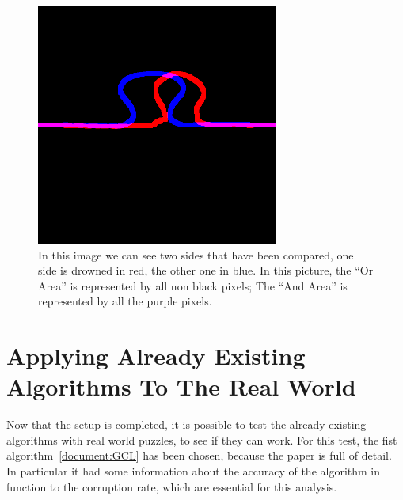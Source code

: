 \documentclass{article}
\begin{document}
\begin{figure}[htbp]
  \centering
  \begin{minipage}[t]{0.44\textwidth}
    \vspace{3pt} %
    \includegraphics[width=\textwidth]{pictures/side_comparation.png}
  \end{minipage}
  \hfill
  \begin{minipage}[t]{0.54\textwidth}
    \caption{\newline
    In this image we can see two sides that have been
    compared, one side is drowned in red, the other one in blue.
    In this picture, the “Or Area” is represented by all non
    black pixels; The “And Area” is represented by all the
    purple pixels.}
  \end{minipage}
\end{figure}
\clearpage

\section{Applying Already Existing Algorithms To The Real World}
Now that the setup is completed, it is possible to test the already existing
algorithms with real world puzzles, to see if they can work. For this test,
the fist algorithm~\ref{document:GCL} has been chosen, because the paper is full of detail.
In particular it had some information about the accuracy of the algorithm in
function to the corruption rate, which are essential for this analysis.
\end{document}
